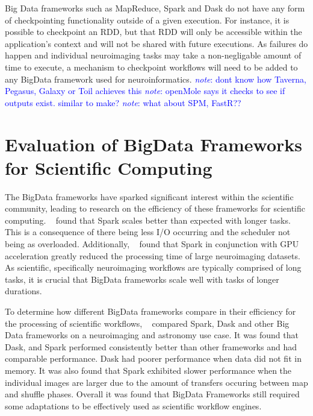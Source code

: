 \documentclass{report}
\newcommand{\note}[1]{\textcolor{blue}{\textit{note}: #1}}
\begin{document}
            Big Data frameworks such as MapReduce, Spark and Dask do not have   
            any form of checkpointing functionality outside of a given          
            execution. For instance, it is possible to checkpoint an RDD, but   
            that RDD will only be accessible within the application's context   
            and will not be shared with future executions. As failures do       
            happen and individual neuroimaging tasks may take a non-negligable  
            amount of time to execute, a mechanism to checkpoint workflows      
            will need to be added to any BigData framework used for             
            neuroinformatics.                                                   
            \note{dont know how Taverna, Pegasus, Galaxy or Toil achieves this} 
            \note{openMole says it checks to see if outputs exist. similar to   
            make?}                                                              
            \note{what about SPM, FastR??}                                      

                                                                                
        \section{Evaluation of BigData Frameworks for Scientific Computing}\label{eval}     
            The BigData frameworks have sparked significant interest within the 
            scientific community, leading to research on the efficiency of      
            these frameworks for scientific computing. ~\cite{souza2017spark} found  
            that Spark scales better than expected with longer tasks. This is   
            a consequence of there being less I/O occurring and the scheduler 
            not being as overloaded. 
            Additionally, ~\cite{boubela2016big} found that Spark in conjunction with  
            GPU acceleration greatly reduced the processing time of large       
            neuroimaging datasets.                                              
            As scientific, specifically neuroimaging workflows are typically    
            comprised of long tasks, it                                         
            is crucial that BigData frameworks scale well with tasks of longer  
            durations.
    
            To determine how different BigData frameworks compare in their 
            efficiency for the processing of scientific workflows, 
            ~\cite{mehta2017comparative} compared Spark, Dask and other Big Data 
            frameworks on
            a neuroimaging and astronomy use case. It was found that Dask, 
            and Spark performed consistently better than other frameworks and 
            had comparable 
            performance. Dask had poorer performance when data did not fit in
            memory. It was also found that Spark exhibited slower performance 
            when the individual images are larger due to the amount of transfers
            occuring between map and shuffle phases. Overall it was
            found that BigData Frameworks still required some adaptations to be
            effectively used as scientific workflow engines.            
            
\end{document}

